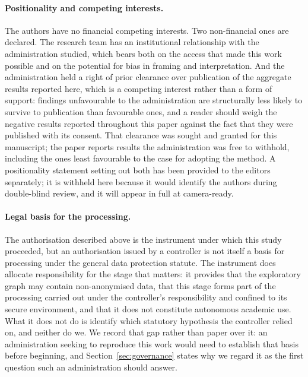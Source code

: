 \paragraph{Positionality and competing interests.}
The authors have no financial competing interests. Two non-financial ones are declared. The
research team has an institutional relationship with the administration studied, which bears
both on the access that made this work possible and on the potential for bias in framing and
interpretation. And the administration held a right of prior clearance over publication of the
aggregate results reported here, which is a competing interest rather than a form of support:
findings unfavourable to the administration are structurally less likely to survive to
publication than favourable ones, and a reader should weigh the negative results reported
throughout this paper against the fact that they were published with its consent. That
clearance was sought and granted for this manuscript; the paper reports results the
administration was free to withhold, including the ones least favourable to the case for
adopting the method. A positionality
statement setting out both has been provided to the editors separately; it is withheld here
because it would identify the authors during double-blind review, and it will appear in full at
camera-ready.

\paragraph{Legal basis for the processing.}
The authorisation described above is the instrument under which this study proceeded, but an
authorisation issued by a controller is not itself a basis for processing under the general data
protection statute. The instrument does allocate responsibility for the stage that matters: it
provides that the exploratory graph may contain non-anonymised data, that this stage forms part
of the processing carried out under the controller's responsibility and confined to its secure
environment, and that it does not constitute autonomous academic use. What it does not do is
identify which statutory hypothesis the controller relied on, and neither do we. We record that
gap rather than paper over it: an administration seeking to reproduce this work would need to
establish that basis before beginning, and Section~\ref{sec:governance} states why we regard it
as the first question such an administration should answer.

